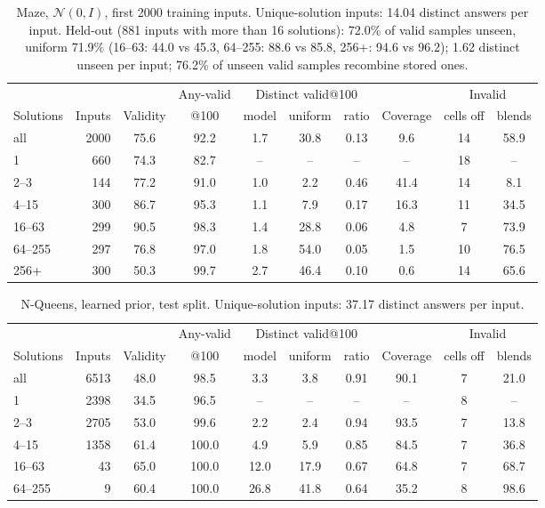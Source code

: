 \documentclass[11pt]{article}
\begin{document}
\begin{table}[H]
\centering\small
\begin{tabular}{@{}lrcccccccc@{}}
\toprule
& & & Any-valid & \multicolumn{3}{c}{Distinct valid@100} & & \multicolumn{2}{c}{Invalid} \\
\cmidrule(lr){5-7}\cmidrule(l){9-10}
Solutions & Inputs & Validity & @100 & model & uniform & ratio & Coverage & cells off & blends \\
\midrule
all & 2000 & 75.6 & 92.2 & 1.7 & 30.8 & 0.13 & 9.6 & 14 & 58.9 \\
1 & 660 & 74.3 & 82.7 & -- & -- & -- & -- & 18 & -- \\
2--3 & 144 & 77.2 & 91.0 & 1.0 & 2.2 & 0.46 & 41.4 & 14 & 8.1 \\
4--15 & 300 & 86.7 & 95.3 & 1.1 & 7.9 & 0.17 & 16.3 & 11 & 34.5 \\
16--63 & 299 & 90.5 & 98.3 & 1.4 & 28.8 & 0.06 & 4.8 & 7 & 73.9 \\
64--255 & 297 & 76.8 & 97.0 & 1.8 & 54.0 & 0.05 & 1.5 & 10 & 76.5 \\
256+ & 300 & 50.3 & 99.7 & 2.7 & 46.4 & 0.10 & 0.6 & 14 & 65.6 \\
\bottomrule
\end{tabular}
\caption{Maze, $\mathcal{N}(0,I)$, first 2000 training inputs. Unique-solution inputs: 14.04 distinct answers per input. Held-out (881 inputs with more than 16 solutions): 72.0\% of valid samples unseen, uniform 71.9\% (16--63: 44.0 vs 45.3, 64--255: 88.6 vs 85.8, 256+: 94.6 vs 96.2); 1.62 distinct unseen per input; 76.2\% of unseen valid samples recombine stored ones.}
\end{table}

\begin{table}[H]
\centering\small
\begin{tabular}{@{}lrcccccccc@{}}
\toprule
& & & Any-valid & \multicolumn{3}{c}{Distinct valid@100} & & \multicolumn{2}{c}{Invalid} \\
\cmidrule(lr){5-7}\cmidrule(l){9-10}
Solutions & Inputs & Validity & @100 & model & uniform & ratio & Coverage & cells off & blends \\
\midrule
all & 6513 & 48.0 & 98.5 & 3.3 & 3.8 & 0.91 & 90.1 & 7 & 21.0 \\
1 & 2398 & 34.5 & 96.5 & -- & -- & -- & -- & 8 & -- \\
2--3 & 2705 & 53.0 & 99.6 & 2.2 & 2.4 & 0.94 & 93.5 & 7 & 13.8 \\
4--15 & 1358 & 61.4 & 100.0 & 4.9 & 5.9 & 0.85 & 84.5 & 7 & 36.8 \\
16--63 & 43 & 65.0 & 100.0 & 12.0 & 17.9 & 0.67 & 64.8 & 7 & 68.7 \\
64--255 & 9 & 60.4 & 100.0 & 26.8 & 41.8 & 0.64 & 35.2 & 8 & 98.6 \\
\bottomrule
\end{tabular}
\caption{N-Queens, learned prior, test split. Unique-solution inputs: 37.17 distinct answers per input.}
\end{table}
\end{document}
